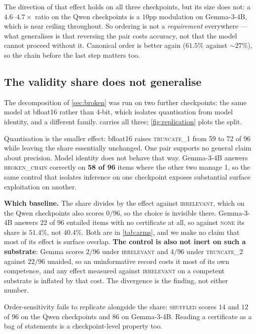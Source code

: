 \documentclass[10pt,twocolumn]{article}
\begin{document}
The direction of that effect holds on all three checkpoints, but its size does
not: a $4.6$--$4.7\times$ ratio on the Qwen checkpoints is a $10$pp modulation on
Gemma-3-4B, which is near ceiling throughout. So ordering is not a
\emph{requirement} everywhere --- what generalises is that reversing the pair
costs accuracy, not that the model cannot proceed without it. Canonical order is better again ($61.5\%$ against ${\sim}27\%$), so the chain before the last step matters
too.

\subsection{The validity share does not generalise}
\label{sec:replication}

The decomposition of \cref{sec:broken} was run on two further checkpoints: the
same model at bfloat16 rather than 4-bit, which isolates quantisation from model
identity, and a different family.  carries all three; \cref{fig:replication} plots the split.

Quantisation is the smaller effect: bfloat16 raises \textsc{truncate\_1} from 59
to 72 of 96 while leaving the share essentially unchanged. One pair supports no
general claim about precision. Model identity does
not behave that way. Gemma-3-4B answers \textsc{broken\_chain} correctly on
\textbf{58 of 96} items where the other two manage 1, so the same control that
isolates inference on one checkpoint exposes substantial surface exploitation on
another.

\textbf{Which baseline.} The share divides by the effect against
\textsc{irrelevant}, which on the Qwen checkpoints also scores $0/96$, so the
choice is invisible there. Gemma-3-4B answers $22$ of $96$ entailed items with no certificate at all, so
against \textsc{none} its share is $51.4\%$, not $40.4\%$. Both are in
\cref{tab:arms}, and we make no claim that most of its effect is surface overlap.
\textbf{The control is also not inert on such a substrate}: Gemma scores $2/96$
under \textsc{irrelevant} and $4/96$ under \textsc{truncate\_2} against $22/96$
unaided, so an uninformative record costs it most of its own competence, and any
effect measured against \textsc{irrelevant} on a competent substrate is inflated
by that cost.
The divergence is the finding, not either number.

Order-sensitivity fails to replicate alongside the share: \textsc{shuffled}
scores $14$ and $12$ of $96$ on the Qwen checkpoints and $86$ on Gemma-3-4B.
Reading a certificate as a bag of statements is a checkpoint-level property too.
\end{document}
